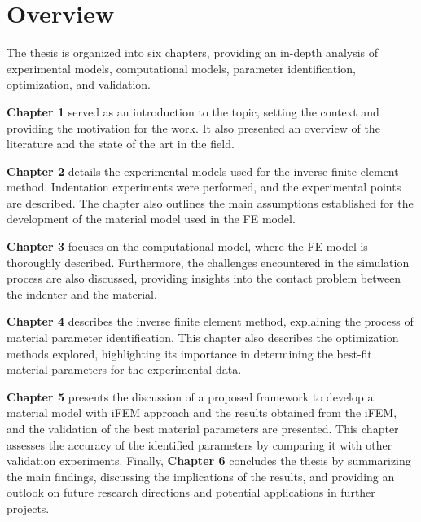 \section{Overview}
The thesis is organized into six chapters, providing an in-depth analysis of experimental models, computational models, 
parameter identification, optimization, and validation. 

\textbf{Chapter 1} served as an introduction to the topic, setting the context and providing the motivation 
for the work. It also presented an overview of the literature and the state of the art in the field.

\textbf{Chapter 2} details the experimental models used for the inverse finite element method. 
Indentation experiments were performed, and the experimental points are described. The chapter also outlines 
the main assumptions established for the development of the material model used in the FE model.

\textbf{Chapter 3} focuses on the computational model, where the FE model is thoroughly described. 
Furthermore, the challenges encountered in the simulation process are also discussed, providing insights into 
the contact problem between the indenter and the material.

\textbf{Chapter 4} describes the inverse finite element method, explaining the process of material parameter identification. 
This chapter also describes the optimization methods explored, highlighting its importance in determining the best-fit 
material parameters for the experimental data.

\textbf{Chapter 5} presents the discussion of a proposed framework to develop a material model with iFEM approach 
and the results obtained from the iFEM, and the validation of the best material parameters are presented. 
This chapter assesses the accuracy of the identified parameters by comparing it with other validation experiments.
Finally, \textbf{Chapter 6} concludes the thesis by summarizing the main findings, discussing the implications of the results, 
and providing an outlook on future research directions and potential applications in further projects.